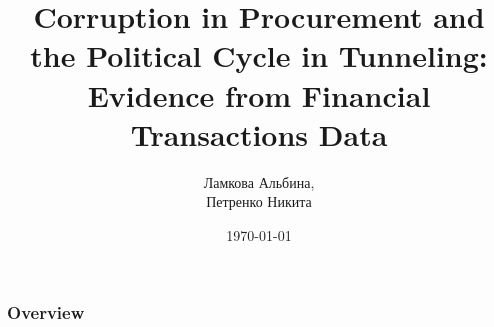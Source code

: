 \documentclass{beamer}
\title[Corruption in Procurement]{Corruption in Procurement and the Political Cycle in Tunneling: Evidence from Financial Transactions Data}
\author{Ламкова Альбина,\\ Петренко Никита}
\date{\today}
\begin{document}
\begin{frame}
\titlepage
\end{frame}

\begin{frame}
\frametitle{Overview} %
\tableofcontents
\end{frame}





\end{document}
